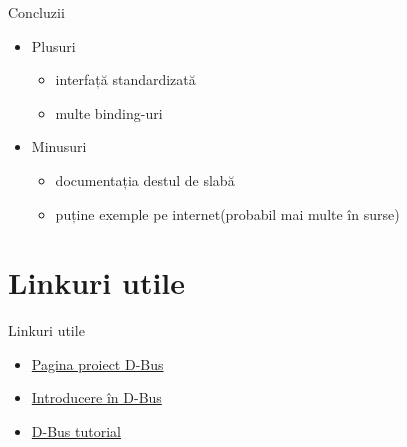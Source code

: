 \documentclass{beamer}
\begin{document}
\begin{frame}{Concluzii}
\begin{itemize}
\item Plusuri
	\begin{itemize}
		\item interfață standardizată
		\item multe binding-uri
	\end{itemize}
\item \pause Minusuri
	\begin{itemize}
		\item documentația destul de slabă
		\item puține exemple pe internet(probabil mai multe în surse)
	\end{itemize}
\end{itemize}
\end{frame}


\section{Linkuri utile}
\frame{\tableofcontents[currentsection]}
\begin{frame}{Linkuri utile}
\begin{itemize}
\item \href{http://www.freedesktop.org/wiki/Software/dbus}{Pagina proiect D-Bus}
\item \href{http://www.freedesktop.org/wiki/IntroductionToDBus}{Introducere în D-Bus}
\item \href{http://dbus.freedesktop.org/doc/dbus-tutorial.html}{D-Bus tutorial}
\end{itemize}
\end{frame}
\end{document}
